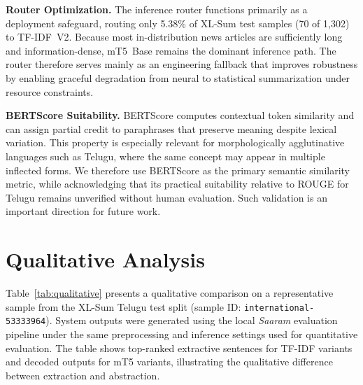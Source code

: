 \documentclass[runningheads]{llncs}
\begin{document}
\textbf{Router Optimization.}
The inference router functions primarily as a deployment safeguard, routing only 5.38\% of XL-Sum test samples (70 of 1,302) to TF-IDF~V2. Because most in-distribution news articles are sufficiently long and information-dense, mT5~Base remains the dominant inference path. The router therefore serves mainly as an engineering fallback that improves robustness by enabling graceful degradation from neural to statistical summarization under resource constraints.

\textbf{BERTScore Suitability.}
BERTScore computes contextual token similarity and can assign partial credit to paraphrases that preserve meaning despite lexical variation. This property is especially relevant for morphologically agglutinative languages such as Telugu, where the same concept may appear in multiple inflected forms. We therefore use BERTScore as the primary semantic similarity metric, while acknowledging that its practical suitability relative to ROUGE for Telugu remains unverified without human evaluation. Such validation is an important direction for future work.

\section{Qualitative Analysis}
\label{sec:qualitative}
Table~\ref{tab:qualitative} presents a qualitative comparison
on a representative sample from the XL-Sum Telugu test split
(sample ID: \texttt{international-53333964}). System outputs
were generated using the local \textit{Saaram} evaluation
pipeline under the same preprocessing and inference settings
used for quantitative evaluation. The table shows top-ranked
extractive sentences for TF-IDF variants and decoded outputs
for mT5 variants, illustrating the qualitative difference
between extraction and abstraction.
\end{document}
